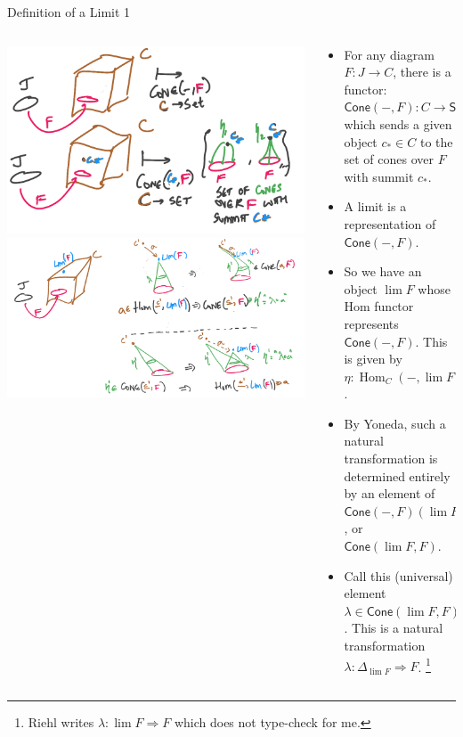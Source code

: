\documentclass[8pt]{beamer}
\newcommand{\nt}{\Rightarrow}
\newcommand{\cat}[1]{\mathsf{#1}}
\newcommand{\cSet}{\cat{Set}}
\newcommand{\cCone}{\cat{Cone}}
\newcommand{\Hom}{\ensuremath{\operatorname{Hom}}}
\begin{document}
\begin{frame}{Definition of a Limit 1}
    \begin{columns}[T] %
        \begin{column}{.48\textwidth}
            \includegraphics[width=\textwidth]{./cone-functor.png}
            \includegraphics[width=\textwidth]{./natural-iso-limit-cone.png}
        \end{column}
        \begin{column}{.6\textwidth}
     \begin{itemize}
         \item For any diagram $F: J \to C$, there is a functor: $\cCone(-, F): C \to \cSet$ which sends
             a given object $c_* \in C$  to the set of cones over $F$ with summit $c_*$. \pause
        \item A limit is a representation of $\cCone(-, F)$. \pause
        \item So we have an object $\lim F$ whose Hom functor represents $\cCone(-, F)$.
              This is given by $\eta: \Hom_C(-, \lim F) \simeq \cCone(-, F)$. \pause
        \item By Yoneda, such a natural transformation is determined entirely by an element of
            $\cCone(-, F)(\lim F)$, or $\cCone(\lim F, F)$. \pause
        \item Call this (universal) element $\lambda \in \cCone(\lim F, F)$. This is a natural transformation
            $\lambda : \Delta_{\lim F} \nt F$. \pause \footnote{Riehl writes $\lambda: \lim F \nt F$ which does not type-check for me.}
     \end{itemize}
    \end{column}
    \end{columns}
\end{frame}
\end{document}
